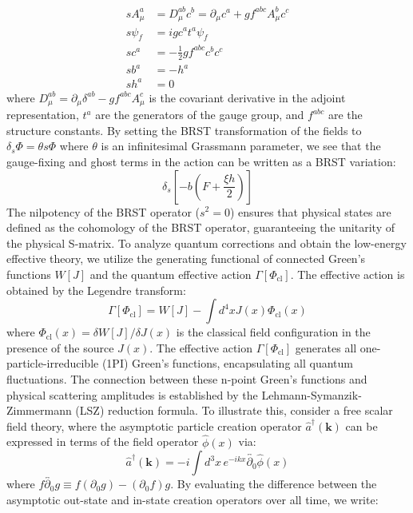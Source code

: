 \begin{align}
s A_\mu^a &= D_\mu^{ab} c^b = \partial_\mu c^a + g f^{abc} A_\mu^b c^c \\
s \psi_f &= i g c^a t^a \psi_f \\
s c^a &= -\frac{1}{2} g f^{abc} c^b c^c \\
s b^a &= -h^a \\
s h^a &= 0
\end{align}
where $D_\mu^{ab} = \partial_\mu \delta^{ab} - g f^{abc} A_\mu^c$ is the covariant derivative in the adjoint representation, $t^a$ are the generators of the gauge group, and $f^{abc}$ are the structure constants. By setting the BRST transformation of the fields to $\delta_s \Phi = \theta s \Phi$ where $\theta$ is an infinitesimal Grassmann parameter, we see that the gauge-fixing and ghost terms in the action can be written as a BRST variation:
\begin{equation}
\delta_s \left[-b\left(F + \frac{\xi h}{2}\right)\right]
\end{equation}
The nilpotency of the BRST operator ($s^2 = 0$) ensures that physical states are defined as the cohomology of the BRST operator, guaranteeing the unitarity of the physical S-matrix. To analyze quantum corrections and obtain the low-energy effective theory, we utilize the generating functional of connected Green's functions $W[J]$ and the quantum effective action $\Gamma[\Phi_{\mathrm{cl}}]$. The effective action is obtained by the Legendre transform:
\begin{equation}
\Gamma[\Phi_{\mathrm{cl}}] = W[J] - \int d^4x J(x) \Phi_{\mathrm{cl}}(x)
\end{equation}
where $\Phi_{\mathrm{cl}}(x) = \delta W[J]/\delta J(x)$ is the classical field configuration in the presence of the source $J(x)$. The effective action $\Gamma[\Phi_{\mathrm{cl}}]$ generates all one-particle-irreducible (1PI) Green's functions, encapsulating all quantum fluctuations. The connection between these n-point Green's functions and physical scattering amplitudes is established by the Lehmann-Symanzik-Zimmermann (LSZ) reduction formula. To illustrate this, consider a free scalar field theory, where the asymptotic particle creation operator $\hat{a}^\dagger(\mathbf{k})$ can be expressed in terms of the field operator $\hat{\phi}(x)$ via:
\begin{equation}
\hat{a}^\dagger(\mathbf{k}) = -i \int d^3x \, e^{-ikx} \overleftrightarrow{\partial_0} \hat{\phi}(x)
\end{equation}
where $f \overleftrightarrow{\partial_0} g \equiv f (\partial_0 g) - (\partial_0 f) g$. By evaluating the difference between the asymptotic out-state and in-state creation operators over all time, we write:
